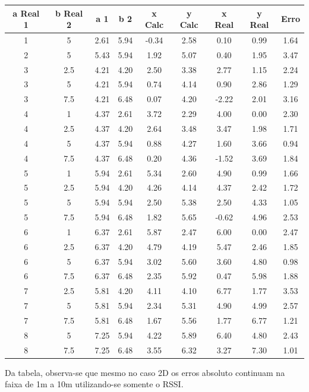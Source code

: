 \begin{center}
    \begin{tabular}{||c c c c c c c c c||} 
    \hline
    a Real 1 & b Real 2 & a 1 & b 2 & x Calc & y Calc	& x Real & y Real & Erro\\ [0.5ex] 
    \hline\hline
    1 & 5 & 2.61 & 5.94 & -0.34 & 2.58 & 0.10 & 0.99 & 1.64\\ 
    \hline
    2 & 5 & 5.43 & 5.94 & 1.92 & 5.07 & 0.40 & 1.95 & 3.47\\ 
    \hline
    3 & 2.5 & 4.21 & 4.20 & 2.50 & 3.38 & 2.77 & 1.15 & 2.24\\ 
    \hline
    3 & 5 & 4.21 & 5.94 & 0.74 & 4.14 & 0.90 & 2.86 & 1.29\\ 
    \hline
    3 & 7.5 & 4.21 & 6.48 & 0.07 & 4.20 & -2.22 & 2.01 & 3.16\\ 
    \hline
    4 & 1 & 4.37 & 2.61 & 3.72 & 2.29 & 4.00 & 0.00 & 2.30\\ 
    \hline
    4 & 2.5 & 4.37 & 4.20 & 2.64 & 3.48 & 3.47 & 1.98 & 1.71\\ 
    \hline
    4 & 5 & 4.37 & 5.94 & 0.88 & 4.27 & 1.60 & 3.66 & 0.94\\ 
    \hline
    4 & 7.5 & 4.37 & 6.48 & 0.20 & 4.36 & -1.52 & 3.69 & 1.84\\ 
    \hline
    5 & 1 & 5.94 & 2.61 & 5.34 & 2.60 & 4.90 & 0.99 & 1.66\\ 
    \hline
    5 & 2.5 & 5.94 & 4.20 & 4.26 & 4.14 & 4.37 & 2.42 & 1.72\\ 
    \hline
    5 & 5 & 5.94 & 5.94 & 2.50 & 5.38 & 2.50 & 4.33 & 1.05\\ 
    \hline
    5 & 7.5 & 5.94 & 6.48 & 1.82 & 5.65 & -0.62 & 4.96 & 2.53\\ 
    \hline
    6 & 1 & 6.37 & 2.61 & 5.87 & 2.47 & 6.00 & 0.00 & 2.47\\ 
    \hline
    6 & 2.5 & 6.37 & 4.20 & 4.79 & 4.19 & 5.47 & 2.46 & 1.85\\ 
    \hline
    6 & 5 & 6.37 & 5.94 & 3.02 & 5.60 & 3.60 & 4.80 & 0.98\\ 
    \hline
    6 & 7.5 & 6.37 & 6.48 & 2.35 & 5.92 & 0.47 & 5.98 & 1.88\\ 
    \hline
    7 & 2.5 & 5.81 & 4.20 & 4.11 & 4.10 & 6.77 & 1.77 & 3.53\\ 
    \hline
    7 & 5 & 5.81 & 5.94 & 2.34 & 5.31 & 4.90 & 4.99 & 2.57\\ 
    \hline
    7 & 7.5 & 5.81 & 6.48 & 1.67 & 5.56 & 1.77 & 6.77 & 1.21\\ 
    \hline
    8 & 5 & 7.25 & 5.94 & 4.22 & 5.89 & 6.40 & 4.80 & 2.43\\ 
    \hline
    8 & 7.5 & 7.25 & 6.48 & 3.55 & 6.32 & 3.27 & 7.30 & 1.01\\ [1ex] 
    \hline
   \end{tabular}
   \end{center}

   Da tabela, observa-se que mesmo no caso 2D os erros absoluto continuam na faixa de 1m a 10m utilizando-se somente o RSSI.







   
   

